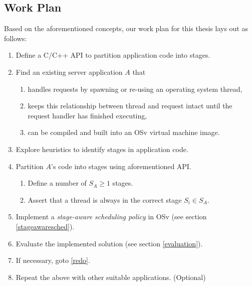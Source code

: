 \documentclass{article}
\begin{document}





\subsection{Work Plan}

Based on the aforementioned concepts, our work plan for this thesis lays out as follows:

\begin{enumerate}
    \item \label{stageapi} Define a C/C++ API to partition application code into stages.
    \item \label{appdesign} Find an existing server application $A$ that
    \begin{enumerate}
        \item handles requests by spawning or re-using an operating system thread,
        \item keeps this relationship between thread and request intact until the request handler has finished executing,
        \item \label{app_osv_image} can be compiled and built into an OSv virtual machine image.
    \end{enumerate}
    \item Explore heuristics to identify stages in application code.
    \item Partition $A$'s code into stages using aforementioned API.
    \begin{enumerate}
        \item Define a number of $S_A \ge 1$ stages.
        \item Assert that a thread is always in the correct stage $S_i \in S_A$.
    \end{enumerate}
    \item \label{redo} Implement a \textit{stage-aware scheduling policy} in OSv (see section \ref{stageawaresched}).
    \item Evaluate the implemented solution (see section \ref{evaluation}).
    \item If necessary, goto \ref{redo}.
    \item Repeat the above with other suitable applications. (Optional)
\end{enumerate}
\end{document}
